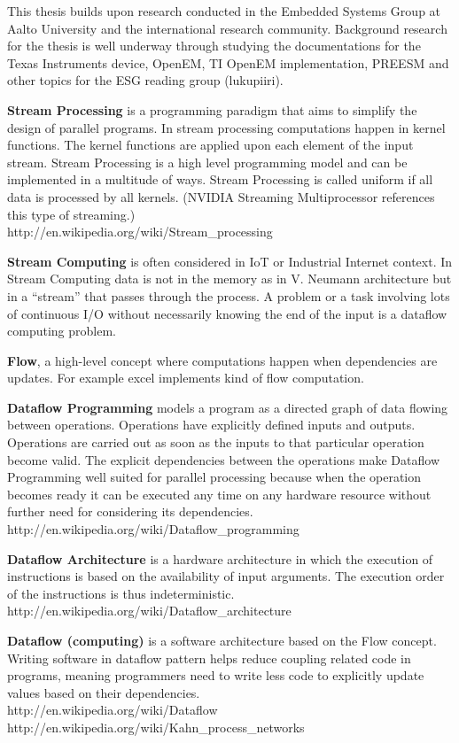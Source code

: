 This thesis builds upon research conducted in the Embedded Systems Group at Aalto University and the international research community. Background research for the thesis is well underway through studying the documentations for the Texas Instruments device, OpenEM, TI OpenEM implementation, PREESM and other topics for the ESG reading group (lukupiiri).

\textbf{Stream Processing} is a programming paradigm that aims to simplify the design of parallel programs. In stream processing computations happen in kernel functions. The kernel functions are applied upon each element of the input stream. Stream Processing is a high level programming model and can be implemented in a multitude of ways. Stream Processing is called uniform if all data is processed by all kernels. (NVIDIA Streaming Multiprocessor references this type of streaming.) \\http://en.wikipedia.org/wiki/Stream\_processing

\textbf{Stream Computing} is often considered in IoT or Industrial Internet context. In Stream Computing data is not in the memory as in V. Neumann architecture but in a ``stream'' that passes through the process. A problem or a task involving lots of continuous I/O without necessarily knowing the end of the input is a dataflow computing problem.

\textbf{Flow}, a high-level concept where computations happen when dependencies are updates. For example excel implements kind of flow computation.

\textbf{Dataflow Programming} models a program as a directed graph of data flowing between operations. Operations have explicitly defined inputs and outputs. Operations are carried out as soon as the inputs to that particular operation become valid. The explicit dependencies between the operations make Dataflow Programming well suited for parallel processing because when the operation becomes ready it can be executed any time on any hardware resource without further need for considering its dependencies.\\http://en.wikipedia.org/wiki/Dataflow\_programming

\textbf{Dataflow Architecture} is a hardware architecture in which the execution of instructions is based on the availability of input arguments. The execution order of the instructions is thus indeterministic.\\http://en.wikipedia.org/wiki/Dataflow\_architecture

\textbf{Dataflow (computing)} is a software architecture based on the Flow concept. Writing software in dataflow pattern helps reduce coupling related code in programs, meaning programmers need to write less code to explicitly update values based on their dependencies.\\http://en.wikipedia.org/wiki/Dataflow\\http://en.wikipedia.org/wiki/Kahn\_process\_networks

